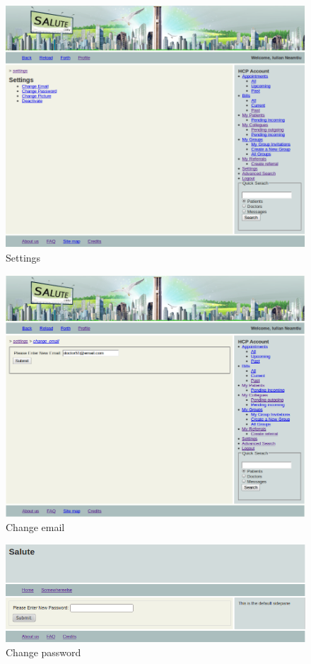 \begin{figure}
\includegraphics[scale=0.5]{screenshots/settings.png}
\caption{Settings}
\end{figure}

\begin{figure}
\includegraphics[scale=0.5]{screenshots/change_email.png}
\caption{Change email}
\end{figure}

\begin{figure}
\includegraphics[scale=0.6]{screenshots/change_password.png}
\caption{Change password}
\end{figure}

